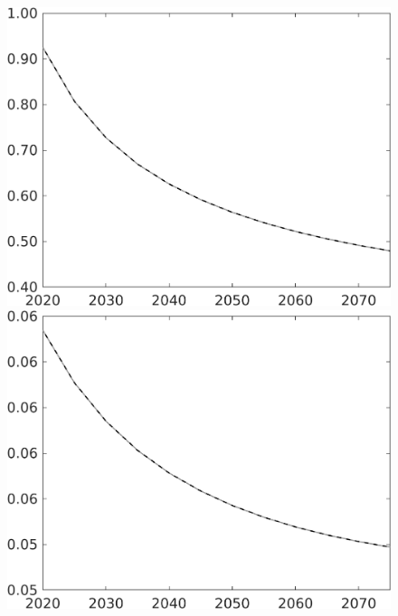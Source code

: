 \documentclass[12pt]{article}
\begin{document}
\begin{figure}[h!!]
\begin{minipage}[]{0.32\textwidth}
	\end{minipage}	
	\begin{minipage}[]{0.32\textwidth}
		\includegraphics[width=1\textwidth]{../../codding_model/own_basedOnFried/optimalPol_010922_revision/figures/all_13Sept22/CompTaul_Equlab_LFBAU_Reg0_pg_spillover0_nsk1_xgr0_knspil0_sep1_countec0_GovRev0_etaa0.79_lgd0.png}
	\end{minipage}	
	\begin{minipage}[]{0.32\textwidth}
		\includegraphics[width=1\textwidth]{../../codding_model/own_basedOnFried/optimalPol_010922_revision/figures/all_13Sept22/CompTaul_Equlab_LFBAU_Reg0_pepn_spillover0_nsk1_xgr0_knspil0_sep1_countec0_GovRev0_etaa0.79_lgd0.png}

\end{minipage}
\end{figure}
\end{document}
